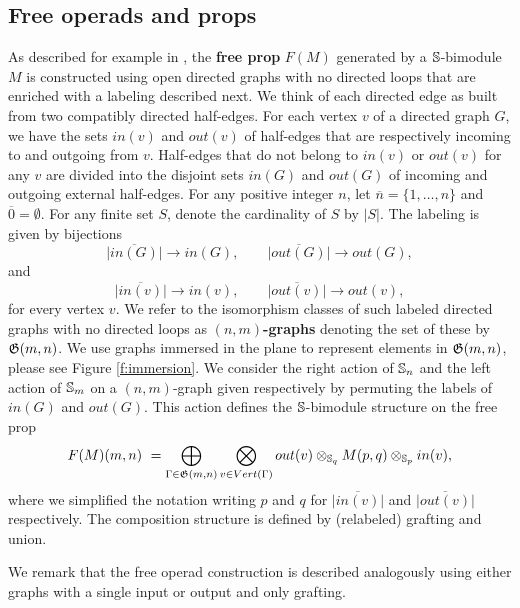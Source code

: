 \subsection{Free operads and props} \label{ss:free props}

As described for example in \cite{Markl08}, the \textbf{free prop} $F(M)$ generated by a \mbox{$\S$-bimodule} $M$ is constructed using open directed graphs with no directed loops that are enriched with a labeling described next. We think of each directed edge as built from two compatibly directed half-edges. For each vertex $v$ of a directed graph $G$, we have the sets $in(v)$ and $out(v)$ of half-edges that are respectively incoming to and outgoing from $v$. Half-edges that do not belong to $in(v)$ or $out(v)$ for any $v$ are divided into the disjoint sets $in(G)$ and $out(G)$ of incoming and outgoing external half-edges. For any positive integer $n$, let $\overline{n} = \{1,\dots,n\}$ and $\overline{0} = \emptyset$. For any finite set $S$, denote the cardinality of $S$ by $|S|$. The labeling is given by bijections  
\begin{equation*}
\overline{|in(G)|}\to in(G), \qquad
\overline{|out(G)|}\to out(G),
\end{equation*}
and
\begin{equation*}
\overline{|in(v)|}\to in(v), \qquad
\overline{|out(v)|}\to out(v),
\end{equation*}
for every vertex $v$.
We refer to the isomorphism classes of such labeled directed graphs with no directed loops as $(n,m)$\textbf{-graphs} denoting the set of these by $\G(m,n)$.
We use graphs immersed in the plane to represent elements in $\G(m,n)$, please see Figure \ref{f:immersion}.
We consider the right action of $\S_n$ and the left action of $\S_m$ on a $(n,m)$-graph given respectively by permuting the labels of $in(G)$ and $out(G)$. This action defines the $\S$-bimodule structure on the free prop
\begin{equation} \label{e:free prop}
F(M)(m,n) \ = \bigoplus_{\Gamma \in \G(m,n)} \bigotimes_{v \in Vert(\Gamma)} out(v) \otimes_{\S_q} M(p, q) \otimes_{\S_p} in(v),
\end{equation}
where we simplified the notation writing $p$ and $q$ for $\overline{|in(v)|}$ and $\overline{|out(v)|}$ respectively. The composition structure is defined by (relabeled) grafting and union.



We remark that the free operad construction is described analogously using either graphs with a single input or output and only grafting.

